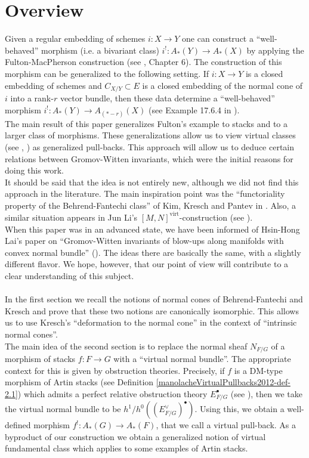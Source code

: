 
\section*{Overview}
Given a regular embedding of schemes $i:X\to Y$ one can construct a ``well-behaved'' morphism  (i.e. a bivariant class) $i^!:A_*(Y)\to A_*(X)$ by applying the Fulton-MacPherson construction (see \cite{f}, Chapter 6). The construction of this morphism can be generalized to the following setting. If $i:X\to Y$ is a closed embedding of schemes and $C_{X/Y}\subset E$ is a closed embedding of the normal cone of $i$ into a rank-$r$ vector bundle, then these data determine a ``well-behaved'' morphism $i^!:A_*(Y)\to A_{(*-r)}(X)$ (see Example 17.6.4 in \cite{f}).
\\The main result of this paper generalizes Fulton's example to stacks and to a larger class of morphisms. These generalizations allow us to view virtual classes (see \cite{lt}, \cite{bf}) as generalized pull-backs. This approach will allow us to deduce certain relations between Gromov-Witten invariants, which were the initial reasons for doing this work.
\\It should be said that the idea is not entirely new, although we did not find this approach in the literature. The main inspiration point was the ``functoriality property of the Behrend-Fantechi class'' of Kim, Kresch and Pantev in \cite{K:01}. Also, a similar situation appears in Jun Li's $[M,N]^{\mathrm{virt}}$-construction (see \cite{Li:01}).
\\When this paper was in an advanced state, we have been informed of Hsin-Hong Lai's paper on ``Gromov-Witten invariants of blow-ups along manifolds with convex normal bundle'' (\cite{h}). The ideas there are basically the same, with a slightly different flavor. We hope, however, that our point of view will contribute to a clear understanding of this subject.
\\
\\In the first section we recall the notions of normal cones of Behrend-Fantechi and Kresch and prove that these two notions are canonically isomorphic. This allows us to use Kresch's ``deformation to the normal cone'' in the context of ``intrinsic normal cones''.
\\The main idea of the second section is to replace the normal sheaf $N_{F/G}$ of a morphism of stacks $f:F\to G$ with a ``virtual normal bundle''. The appropriate context for this is given by obstruction theories. Precisely, if $f$ is a DM-type morphism of Artin stacks (see Definition \ref{manolacheVirtualPullbacks2012-def-2.1}) which admits a perfect relative obstruction theory $E_{F/G}^{\bullet}$ (see \cite{bf}), then we take the virtual normal bundle to be $h^1/h^0((E_{F/G}^{\vee})^{\bullet})$. Using this, we obtain a well-defined morphism $f^!:A_*(G)\to A_*(F)$, that we call a virtual pull-back. As a byproduct of our construction we obtain a generalized notion of virtual fundamental class which applies to some examples of Artin stacks.
